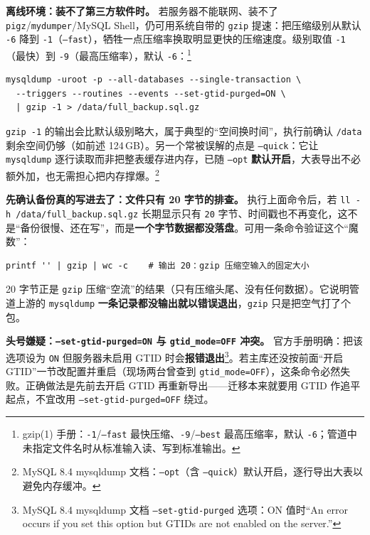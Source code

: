 \documentclass[12pt,UTF8]{ctexbook}
\begin{document}
\textbf{离线环境：装不了第三方软件时。} 若服务器不能联网、装不了 \texttt{pigz}/\texttt{mydumper}/MySQL Shell，仍可用系统自带的 \texttt{gzip} 提速：把压缩级别从默认 \texttt{-6} 降到 \texttt{-1}（\texttt{--fast}），牺牲一点压缩率换取明显更快的压缩速度。级别取值 \texttt{-1}（最快）到 \texttt{-9}（最高压缩率），默认 \texttt{-6}：\footnote{gzip(1) 手册：\texttt{-1}/\texttt{--fast} 最快压缩、\texttt{-9}/\texttt{--best} 最高压缩率，默认 \texttt{-6}；管道中未指定文件名时从标准输入读、写到标准输出。}

\begin{lstlisting}
mysqldump -uroot -p --all-databases --single-transaction \
  --triggers --routines --events --set-gtid-purged=ON \
  | gzip -1 > /data/full_backup.sql.gz
\end{lstlisting}

\texttt{gzip -1} 的输出会比默认级别略大，属于典型的“空间换时间”，执行前确认 \texttt{/data} 剩余空间仍够（如前述 124\,GB）。另一个常被误解的点是 \texttt{--quick}：它让 \texttt{mysqldump} 逐行读取而非把整表缓存进内存，已随 \texttt{--opt} \textbf{默认开启}，大表导出不必额外加，也无需担心把内存撑爆。\footnote{MySQL 8.4 mysqldump 文档：\texttt{--opt}（含 \texttt{--quick}）默认开启，逐行导出大表以避免内存缓冲。}

\textbf{先确认备份真的写进去了：文件只有 20 字节的排查。} 执行上面命令后，若 \texttt{ll -h /data/full\_backup.sql.gz} 长期显示只有 \texttt{20} 字节、时间戳也不再变化，这不是“备份很慢、还在写”，而是\textbf{一个字节数据都没落盘}。可用一条命令验证这个“魔数”：

\begin{lstlisting}
printf '' | gzip | wc -c    # 输出 20：gzip 压缩空输入的固定大小
\end{lstlisting}

20 字节正是 \texttt{gzip} 压缩“空流”的结果（只有压缩头尾、没有任何数据）。它说明管道上游的 \texttt{mysqldump} \textbf{一条记录都没输出就以错误退出}，\texttt{gzip} 只是把空气打了个包。

\textbf{头号嫌疑：\texttt{--set-gtid-purged=ON} 与 \texttt{gtid\_mode=OFF} 冲突。} 官方手册明确：把该选项设为 \texttt{ON} 但服务器未启用 GTID 时会\textbf{报错退出}\footnote{MySQL 8.4 mysqldump 文档 \texttt{--set-gtid-purged} 选项：ON 值时“An error occurs if you set this option but GTIDs are not enabled on the server.”}。若主库还没按前面“开启 GTID”一节改配置并重启（现场两台曾查到 \texttt{gtid\_mode=OFF}），这条命令必然失败。正确做法是先前去开启 GTID 再重新导出——迁移本来就要用 GTID 作追平起点，不宜改用 \texttt{--set-gtid-purged=OFF} 绕过。
\end{document}
